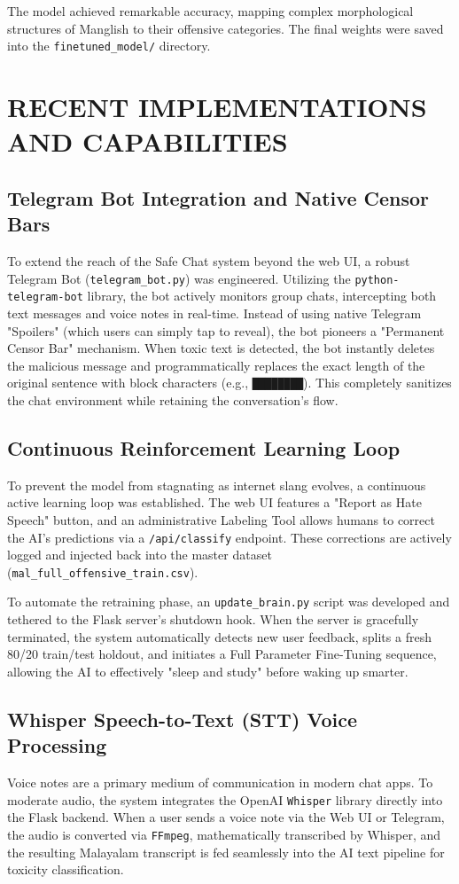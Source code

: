 \documentclass[12pt,a4paper]{report}
\begin{document}
The model achieved remarkable accuracy, mapping complex morphological structures of Manglish to their offensive categories. The final weights were saved into the \texttt{finetuned\_model/} directory.

\chapter{RECENT IMPLEMENTATIONS AND CAPABILITIES}

\section{Telegram Bot Integration and Native Censor Bars}
To extend the reach of the Safe Chat system beyond the web UI, a robust Telegram Bot (\texttt{telegram\_bot.py}) was engineered. Utilizing the \texttt{python-telegram-bot} library, the bot actively monitors group chats, intercepting both text messages and voice notes in real-time. Instead of using native Telegram "Spoilers" (which users can simply tap to reveal), the bot pioneers a "Permanent Censor Bar" mechanism. When toxic text is detected, the bot instantly deletes the malicious message and programmatically replaces the exact length of the original sentence with block characters (e.g., \texttt{████████}). This completely sanitizes the chat environment while retaining the conversation's flow.

\section{Continuous Reinforcement Learning Loop}
To prevent the model from stagnating as internet slang evolves, a continuous active learning loop was established. The web UI features a "Report as Hate Speech" button, and an administrative Labeling Tool allows humans to correct the AI's predictions via a \texttt{/api/classify} endpoint. These corrections are actively logged and injected back into the master dataset (\texttt{mal\_full\_offensive\_train.csv}). 

To automate the retraining phase, an \texttt{update\_brain.py} script was developed and tethered to the Flask server's shutdown hook. When the server is gracefully terminated, the system automatically detects new user feedback, splits a fresh 80/20 train/test holdout, and initiates a Full Parameter Fine-Tuning sequence, allowing the AI to effectively "sleep and study" before waking up smarter.

\section{Whisper Speech-to-Text (STT) Voice Processing}
Voice notes are a primary medium of communication in modern chat apps. To moderate audio, the system integrates the OpenAI \texttt{Whisper} library directly into the Flask backend. When a user sends a voice note via the Web UI or Telegram, the audio is converted via \texttt{FFmpeg}, mathematically transcribed by Whisper, and the resulting Malayalam transcript is fed seamlessly into the AI text pipeline for toxicity classification.
\end{document}
